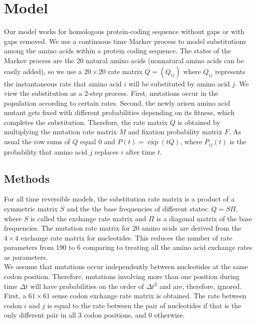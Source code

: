 \documentclass[13pt]{article}
\begin{document}
\section{Model}
Our model works for homologous protein-coding sequence without gaps or with gaps removed. We use a continuous time Markov process to model substitutions among the amino acids within a protein coding sequence. The states of the Markov process are the 20 natural amino acids (nonnatural amino acids can be easily added), so we use a $20 \times 20$ rate matrix $Q=(Q_{ij})$ where $Q_{ij}$ represents the instantaneous rate that amino acid $i$ will be substituted by amino acid $j$. We view the substitution as a 2-step process. First, mutations occur in the population according to certain rates. Second, the newly arisen amino acid mutant gets fixed with different probabilities depending on its fitness, which completes the substitution. Therefore, the rate matrix $Q$ is obtained by multiplying the mutation rate matrix $M$ and fixation probability matrix $F$. As usual the row sums of $Q$ equal $0$ and $P(t) = \exp (tQ)$, where $P_{ij}(t)$ is the probability that amino acid $j$ replaces $i$ after time $t$.\\

\subsection{Methods}
For all time reversible models, the substitution rate matrix is a product of a symmetric matrix $S$ and the the base frequencies of different states: $Q = S\Pi$, where $S$ is called the exchange rate matrix and $\Pi$ is a diagonal matrix of the base frequencies. The mutation rate matrix for 20 amino acids are derived from the $4 \times 4 $ exchange rate matrix for nucleotides. This reduces the number of rate parameters from 190 to 6 comparing to treating all the amino acid exchange rates as parameters.\\

We assume that mutations occur independently between nucleotides at the same codon position. Therefore, mutations involving more than one position during time $\Delta t$ will have probabilities on the order of $\Delta t^2$ and are, therefore, ignored. First, a $61 \times 61$ sense codon exchange rate matrix is obtained. The rate between codon $i$ and $j$ is equal to the rate between the pair of nucleotides if that is the only different pair in all 3 codon positions, and 0 otherwise.\\
\end{document}
